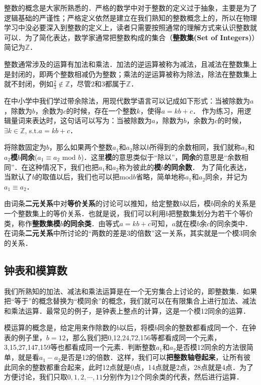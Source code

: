 
整数的概念是大家所熟悉的．严格的数学中对于整数的定义过于抽象，主要是为了逻辑基础的严谨性；严格定义依然是建立在我们熟知的整数概念上的，所以在物理学习中没必要深入到整数的定义上，读者只需要按照通常的理解方式来认识整数就可以．为了简化表达，数学家通常把整数构成的集合（\textbf{整数集(Set of Integers)}）简记为$\mathbb{Z}$．

整数通常涉及的运算有加法和乘法．加法的逆运算被称为减法，且减法在整数集上是封闭的，即两个整数相减仍为整数；乘法的逆运算被称为除法，除法在整数集上就不封闭，例如$\frac{2}{3}\not\in\mathbb{Z}$，尽管$2$和$3$都属于$\mathbb{Z}$． 

在中小学中我们学过带余除法，用现代数学语言可以记成如下形式：当被除数为$a$，除数为$b$，余数为$c$的时候，存在一个整数$k$，使得$a=kb+c$． 作为练习，用逻辑量词来表达时，这句话可以写为：当被除数为$a$，除数为$b$，余数为$c$的时候，$\exists k\in \mathbb{Z}$, s.t.$ a=kb+c$． 

将除数固定为$b$，那么如果两个整数$a_1$和$a_2$除以$b$所得到的余数相同，我们就称$a_1$和$a_2$\textbf{模}$b$\textbf{同余}($a_1\equiv a_2$ mod $b$)．这里\textbf{模}的意思类似于“除以”，\textbf{同余}的意思是“余数相同”．在这种情况下，我们也把$a_1$和$a_2$称为彼此的\textbf{模}$b$\textbf{的同余数}． 为了简化表达，当默认了$b$的取值以后，我们也可以把mod$b$省略，简单地称$a_1$和$a_2$同余，并记为$a_1\equiv a_2$． 

由词条\textbf{二元关系}中对\textbf{等价关系}的讨论可以推知，给定整数$b$以后，模$b$同余的关系是一个整数集上的等价关系．也就是说，我们可以利用$b$把整数集划分为若干个等价类，称作\textbf{整数集模}$b$\textbf{的同余类}．由等式$a=kb+c$可知，$a$就在模$b$余$c$的同余类中．在词条\textbf{二元关系}中所讨论的“两数的差是3的倍数”这一关系，其实就是一个模3同余的关系．

\subsection{钟表和模算数}

我们所熟知的加法、减法和乘法运算是在一个无穷集合上讨论的，即整数集．如果把“等于”的概念替换为“模同余”的概念，我们就可以在有限集合上进行加法、减法和乘法运算．最常见的例子，是钟表上整点的计算，这是一个模12同余的运算．

模运算的概念是，给定用来作除数的$b$以后，将模$b$同余的整数都看成同一个．在钟表的例子里，$b=12$，那么我们把0,12,24,72,156等都看成同一个元素，3,15,27,147,159等也都看成同一个元素．判断整数$a_1$和$a_2$是否模12同余的方法很简单，就是看$a_1-a_2$是否是12的倍数．这样，我们可以\textbf{把整数轴卷起来}，让所有彼此同余的整数都重合起来，此时12点就是0点，14点就是2点，28点就是4点．为了方便讨论，我们只取$0,1,2,\cdots,11$分别作为12个同余类的代表，然后进行运算．

